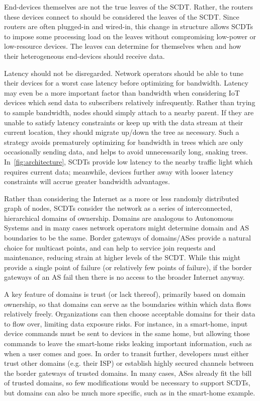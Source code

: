 End-devices themselves are not the true leaves of the SCDT.  Rather, the routers
these devices connect to should be considered the leaves of the SCDT.  Since
routers are often plugged-in and wired-in, this change in structure allows SCDTs
to impose some processing load on the leaves without compromising low-power or
low-resource devices.  The leaves can determine for themselves when and how
their heterogeneous end-devices should receive data.

Latency should not be disregarded.  Network operators should be able to tune
their devices for a worst case latency before
optimizing for bandwidth.  Latency may even be a more important factor than
bandwidth when considering IoT devices which send data to subscribers relatively
infrequently.  Rather than trying to sample bandwidth, nodes should simply
attach to a nearby parent.  If they are unable to satisfy latency constraints or
keep up with the data stream at their current location, they should migrate
up/down the tree as necessary.  Such a strategy avoids prematurely optimizing
for bandwidth in trees which are only occasionally sending data, and helps to
avoid unnecessarily long, snaking trees.  In~\autoref{fig:architecture}, SCDTs 
provide low latency
to the nearby traffic light which requires current data; meanwhile, devices
further away with looser latency constraints will accrue greater bandwidth
advantages. 

Rather than considering the Internet as a more or less randomly
distributed graph of nodes, SCDTs consider the network as a series of
interconnected, hierarchical domains of ownership.  Domains are analogous to
Autonomous Systems \cite{RFC1930} and in many cases network operators might
determine domain and AS boundaries to be the same.  Border gateways of
domains/ASes provide a natural choice for multicast points, and can help to
service join requests and maintenance, reducing strain at higher levels of the
SCDT.  While this might provide a single point of failure (or relatively few
points of failure), if the border gateways of an AS fail then there is no access to the
broader Internet anyway.  

A key feature of domains is trust (or lack thereof), primarily based
on domain ownership, so that domains can serve as the boundaries within which
data flows relatively freely.  Organizations can then choose acceptable
domains for their data to flow over, limiting data exposure risks.  For
instance, in a smart-home, input device commands must be sent to devices in
the same home, but allowing those commands to leave the smart-home risks
leaking important information, such as when a user comes and goes.  In order to transit further, developers must either trust other domains (e.g. their ISP) or establish highly secured channels between the border gateways of trusted domains.  In many cases, ASes already fit the bill of trusted domains, so few modifications would be necessary to support SCDTs, but domains can also be much more specific, such as in the smart-home example.  

